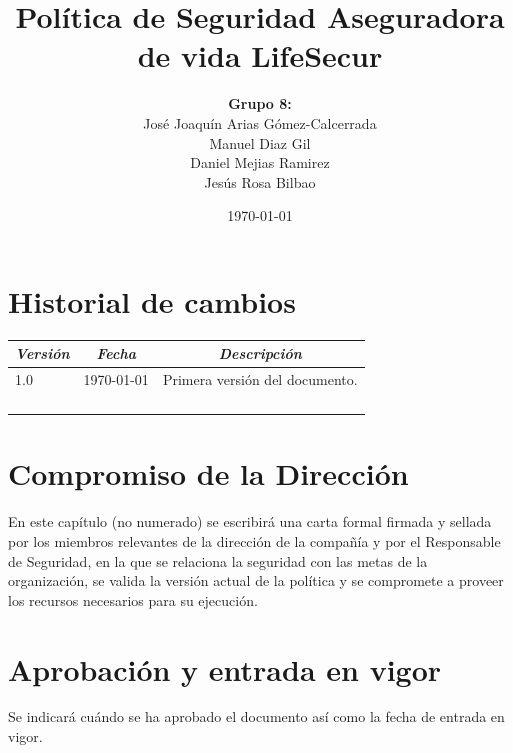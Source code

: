 \documentclass[11pt,bibtotoc,noliststotoc,BCOR0mm]{scrbook}
\title{Política de Seguridad Aseguradora de vida LifeSecur}
\author{
	\textbf{Grupo 8:}\\
    José Joaquín Arias Gómez-Calcerrada\\
	Manuel Diaz Gil\\
	Daniel Mejias Ramirez\\
	Jesús Rosa Bilbao\\
}
\date{\today}
\newcommand{\cellcenter}[1]{\multicolumn{1}{c}{#1}}
\newcommand{\thead}[1]{\textbf{\emph{#1}}}
\begin{document}
\begin{titlepage}
  \maketitle
\end{titlepage}

\frontmatter
\pagestyle{empty}

\tableofcontents
\listoffigures
\listoftables


\chapter{Historial de cambios}

\begin{center}
  \centering
  \begin{tabular}{|m{}|m{}|m{}|}
    \cellcenter{\thead{Versión}} & \cellcenter{\thead{Fecha}} & \cellcenter{\thead{Descripción}} \\
    \hline
    1.0 & \today & Primera versión del documento. \\ \hline
    & &  \\ \hline
    & &  \\ \hline
    & &  \\ \hline
    & &  \\ \hline
  \end{tabular}
\end{center}


\chapter{Compromiso de la Dirección}

En este capítulo (no numerado) se escribirá una carta formal firmada y
sellada por los miembros relevantes de la dirección de la compañía y
por el Responsable de Seguridad, en la que se relaciona la seguridad
con las metas de la organización, se valida la versión actual de la
política y se compromete a proveer los recursos necesarios para su
ejecución.


\chapter{Aprobación y entrada en vigor}

Se indicará cuándo se ha aprobado el documento así como la fecha de entrada 
en vigor. 

\mainmatter
\pagestyle{scrheadings}
\end{document}
